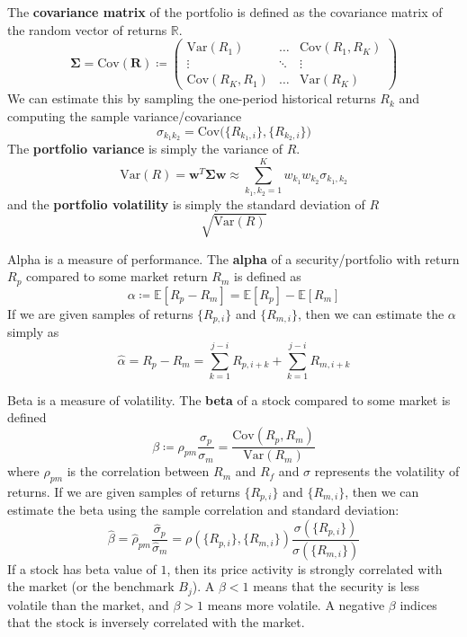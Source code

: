 \documentclass{article}
\begin{document}
\begin{definition}
The \textbf{covariance matrix} of the portfolio is defined as the covariance matrix of the random vector of returns $\mathbb{R}$. 
\[\boldsymbol{\Sigma} = \mathrm{Cov}(\mathbf{R}) \coloneqq \begin{pmatrix} \mathrm{Var}(R_1) & \ldots & \mathrm{Cov}(R_1, R_K) \\ \vdots & \ddots & \vdots \\ \mathrm{Cov}(R_K, R_1) & \ldots & \mathrm{Var}(R_K) \end{pmatrix} \]
We can estimate this by sampling the one-period historical returns $R_k$ and computing the sample variance/covariance 
\[\sigma_{k_1 k_2} = \mathrm{Cov} \big( \{R_{k_1, i}\}, \{R_{k_2, i}\} \big)\]
The \textbf{portfolio variance} is simply the variance of $R$. 
\[\mathrm{Var}(R) = \mathbf{w}^T \boldsymbol{\Sigma} \mathbf{w} \approx \sum_{k_1, k_2 = 1}^K w_{k_1} w_{k_2} \sigma_{k_1, k_2}\]
and the \textbf{portfolio volatility} is simply the standard deviation of $R$ 
\[\sqrt{\mathrm{Var}(R)}\] 
\end{definition}

\begin{definition}[Alpha]
Alpha is a measure of performance. The \textbf{alpha} of a security/portfolio with return $R_p$ compared to some market return $R_m$ is defined as 
\[\alpha \coloneqq \mathbb{E}[R_p - R_m] = \mathbb{E}[R_p] - \mathbb{E}[R_m]\]
If we are given samples of returns $\{R_{p, i}\}$ and $\{R_{m, i}\}$, then we can estimate the $\alpha$ simply as 
\[\hat{\alpha} = R_p - R_m = \sum_{k = 1}^{j-i} R_{p, i + k} + \sum_{k=1}^{j-i} R_{m, i + k}\]
\end{definition}

\begin{definition}[Beta]
Beta is a measure of volatility. The \textbf{beta} of a stock compared to some market is defined 
\[\beta \coloneqq \rho_{pm} \frac{\sigma_p}{\sigma_m} = \frac{\mathrm{Cov}(R_p, R_m)}{\mathrm{Var}(R_m)}\]
where $\rho_{pm}$ is the correlation between $R_m$ and $R_f$ and $\sigma$ represents the volatility of returns. If we are given samples of returns $\{R_{p, i}\}$ and $\{R_{m, i}\}$, then we can estimate the beta using the sample correlation and standard deviation: 
\[\hat{\beta} = \hat{\rho}_{pm} \frac{\hat{\sigma}_p}{\hat{\sigma}_m} = \rho(\{R_{p, i}\}, \{R_{m, i}\}) \frac{\sigma(\{R_{p, i}\})}{\sigma(\{R_{m, i}\})} \]
If a stock has beta value of $1$, then its price activity is strongly correlated with the market (or the benchmark $B_j$). A $\beta < 1$ means that the security is less volatile than the market, and $\beta > 1$ means more volatile. A negative $\beta$ indices that the stock is inversely correlated with the market. 
\end{definition}
\end{document}

